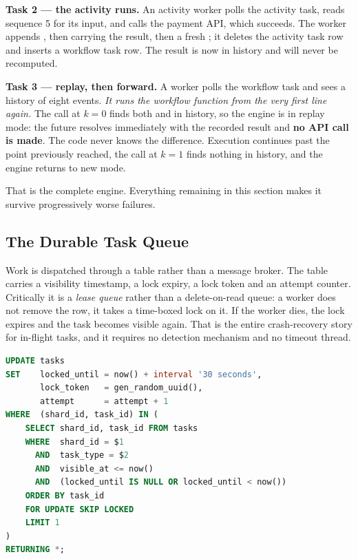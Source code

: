 \textbf{Task 2 --- the activity runs.} An activity worker polls the activity
task, reads sequence 5 for its input, and calls the payment API, which
succeeds. The worker appends , then
 carrying the result, then a fresh
; it deletes the activity task row and inserts a
workflow task row. The result is now in history and will never be recomputed.

\textbf{Task 3 --- replay, then forward.} A worker polls the workflow task and
sees a history of eight events. \emph{It runs the workflow function from the
very first line again.} The call at $k=0$ finds both
 and  in history, so the
engine is in replay mode: the future resolves immediately with the recorded
result and \textbf{no API call is made}. The code never knows the difference.
Execution continues past the point previously reached, the call at $k=1$ finds
nothing in history, and the engine returns to new mode.

That is the complete engine. Everything remaining in this section makes it
survive progressively worse failures.

\subsection{The Durable Task Queue}

Work is dispatched through a table rather than a message broker. The table
carries a visibility timestamp, a lock expiry, a lock token and an attempt
counter. Critically it is a \emph{lease queue} rather than a delete-on-read
queue: a worker does not remove the row, it takes a time-boxed lock on it. If
the worker dies, the lock expires and the task becomes visible again. That is
the entire crash-recovery story for in-flight tasks, and it requires no
detection mechanism and no timeout thread.

\begin{lstlisting}[language=SQL, caption={The poll query. \texttt{SKIP LOCKED}
  is what allows many workers to dequeue concurrently without serialising
  behind a single row lock.}, label={lst:poll}]
UPDATE tasks
SET    locked_until = now() + interval '30 seconds',
       lock_token   = gen_random_uuid(),
       attempt      = attempt + 1
WHERE  (shard_id, task_id) IN (
    SELECT shard_id, task_id FROM tasks
    WHERE  shard_id = $1
      AND  task_type = $2
      AND  visible_at <= now()
      AND  (locked_until IS NULL OR locked_until < now())
    ORDER BY task_id
    FOR UPDATE SKIP LOCKED
    LIMIT 1
)
RETURNING *;
\end{lstlisting}

